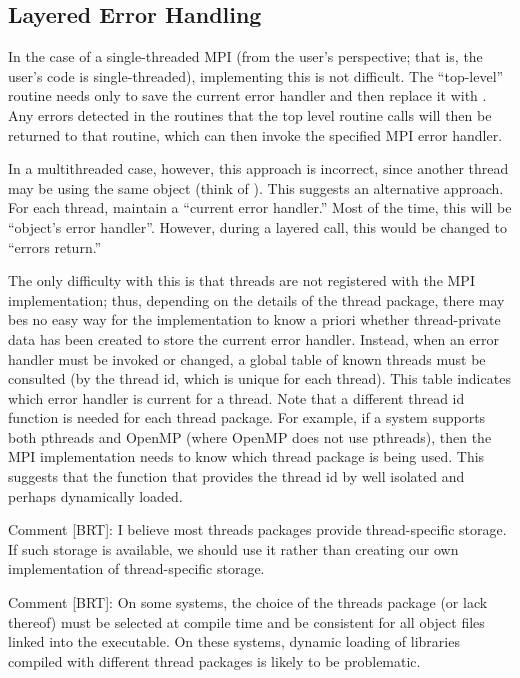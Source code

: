\documentclass{article}
\begin{document}
\subsection{Layered Error Handling}
In the case of a single-threaded MPI (from the
user's perspective; that is, the user's code is single-threaded),
implementing this is not difficult.  The ``top-level'' routine needs
only to save the current error handler and then replace it with
.  Any errors detected in the routines
that the top level routine calls will then be returned to that
routine, which can then invoke the specified MPI error handler.

In a multithreaded case, however, this approach is incorrect, since
another thread may be using the same object (think of
).  This suggests an alternative approach.
For each thread, maintain a ``current error handler.''  Most of the
time, this will be ``object's error handler''.  However, during a
layered call, this would be changed to ``errors return.''  

The only difficulty with this is that threads are not registered with
the MPI implementation; thus, depending on the details of the thread package,
there may bes no easy way for the implementation
to know a priori whether thread-private data has been created to store
the current error handler.  Instead, when an error handler must be
invoked or changed, a global table of known threads must be consulted
(by the thread id, which is unique for each thread).  This table
indicates which error handler is current for a thread.  
Note that a different thread id function is needed for each thread
package.  For example, if a system supports both pthreads and OpenMP
(where OpenMP does not use pthreads), then the MPI implementation
needs to know which thread package is being used.  This suggests that
the function that provides the thread id by well isolated and perhaps
dynamically loaded.

Comment [BRT]: I believe most threads packages provide thread-specific
storage.  If such storage is available, we should use it rather than
creating our own implementation of thread-specific storage.

Comment [BRT]: On some systems, the choice of the threads package (or
lack thereof) must be selected at compile time and be consistent for
all object files linked into the executable.  On these systems,
dynamic loading of libraries compiled with different thread packages
is likely to be problematic.
\end{document}
